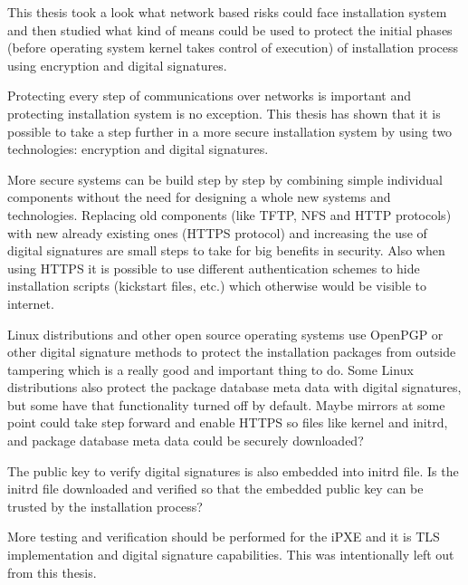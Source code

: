 
\iffalse
\begin{itemize}
\item FIXME: remove this list
\item CONCLUSIONS: reference to purpose of study
\item CONCLUSIONS: value of / reasons for the study
\item CONCLUSIONS: review of important findings / conclusions
\item CONCLUSIONS: comments, explanations or speculations about findings
\item CONCLUSIONS: limitations of study
\item CONCLUSIONS: implications of study or generalizations
\item CONCLUSIONS: recommendations for future or practical applications - USUALLY SKIPPED
\end{itemize}
\fi

This thesis took a look what network based risks could face
installation system and then studied what kind of means could be used
to protect the initial phases (before operating system kernel takes
control of execution) of installation process using encryption and
digital signatures.

Protecting every step of communications over networks is important and
protecting installation system is no exception. This thesis has shown
that it is possible to take a step further in a more secure
installation system by using two technologies: encryption and digital
signatures.

More secure systems can be build step by step by combining simple
individual components without the need for designing a whole new
systems and technologies. Replacing old components (like TFTP, NFS and
HTTP protocols) with new already existing ones (HTTPS protocol) and
increasing the use of digital signatures are small steps to take for
big benefits in security. Also when using HTTPS it is possible to use
different authentication schemes to hide installation scripts
(kickstart files, etc.) which otherwise would be visible to internet.

Linux distributions and other open source operating systems use
OpenPGP or other digital signature methods to protect the installation
packages from outside tampering which is a really good and important
thing to do. Some Linux distributions also protect the package
database meta data with digital signatures, but some have that
functionality turned off by default. Maybe mirrors at some point could
take step forward and enable HTTPS so files like kernel and initrd,
and package database meta data could be securely downloaded?

The public key to verify digital signatures is also embedded into
initrd file. Is the initrd file downloaded and verified so that the
embedded public key can be trusted by the installation process?

More testing and verification should be performed for the iPXE and
it is TLS implementation and digital signature capabilities. This was
intentionally left out from this thesis.

